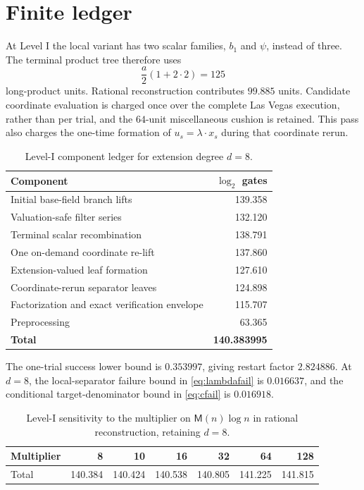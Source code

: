 \documentclass[11pt,a4paper]{article}
\theoremstyle{definition}
\theoremstyle{remark}
\newcommand{\M}{\mathsf M}
\begin{document}
\section{Finite ledger}

At Level I the local variant has two scalar families, $b_1$ and $\psi$, instead of three.  The terminal product tree therefore uses
\[
 \frac a2(1+2\cdot2)=125
\]
long-product units.  Rational reconstruction contributes $99.885$ units.  Candidate coordinate evaluation is charged once over the complete Las Vegas execution, rather than per trial, and the $64$-unit miscellaneous cushion is retained.  This pass also charges the one-time formation of $u_s=\lambda\cdot x_s$ during that coordinate rerun.

\begin{table}[h]
\centering
\caption{Level-I component ledger for extension degree $d=8$.}
\label{tab:components}
\begin{tabularx}{0.88\textwidth}{@{}Xr@{}}
\toprule
Component & $\log_2$ gates\\
\midrule
Initial base-field branch lifts & 139.358\\
Valuation-safe filter series & 132.120\\
Terminal scalar recombination & 138.791\\
One on-demand coordinate re-lift & 137.860\\
Extension-valued leaf formation & 127.610\\
Coordinate-rerun separator leaves & 124.898\\
Factorization and exact verification envelope & 115.707\\
Preprocessing & 63.365\\
\midrule
\textbf{Total} & \textbf{140.383995}\\
\bottomrule
\end{tabularx}
\end{table}

The one-trial success lower bound is $0.353997$, giving restart factor $2.824886$.  At $d=8$, the local-separator failure bound in \eqref{eq:lambdafail} is $0.016637$, and the conditional target-denominator bound in \eqref{eq:cfail} is $0.016918$.

\begin{table}[h]
\centering
\caption{Level-I sensitivity to the multiplier on $\M(n)\log n$ in rational reconstruction, retaining $d=8$.}
\label{tab:sensitivity}
\begin{tabular}{@{}lrrrrrr@{}}
\toprule
Multiplier & 8 & 10 & 16 & 32 & 64 & 128\\
\midrule
Total & 140.384 & 140.424 & 140.538 & 140.805 & 141.225 & 141.815\\
\bottomrule
\end{tabular}
\end{table}
\end{document}
